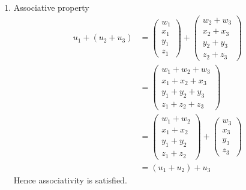\documentclass[12pt,letterpaper,fleqn]{article}
\theoremstyle{definition}
\begin{document}
\begin{enumerate}
\item Associative property
\begin{equation*}
\begin{split}
u_1 + (u_2 + u_3) &=
\begin{pmatrix}
w_1\\
x_1\\
y_1\\
z_1
\end{pmatrix} +
\begin{pmatrix}
w_2 + w_3\\
x_2 + x_3\\
y_2 + y_3\\
z_2 + z_3
\end{pmatrix}\\
&= \begin{pmatrix}
w_1 + w_2 + w_3\\
x_1 + x_2 + x_3\\
y_1 + y_2 + y_3\\
z_1 + z_2 + z_3
\end{pmatrix}\\
&= \begin{pmatrix}
w_1 + w_2\\
x_1 + x_2\\
y_1 + y_2\\
z_1 + z_2
\end{pmatrix} + 
\begin{pmatrix}
w_3\\
x_3\\
y_3\\
z_3
\end{pmatrix}\\
&= (u_1 + u_2) + u_3
\end{split}
\end{equation*}
Hence associativity is satisfied.


\end{enumerate}
\end{document}
